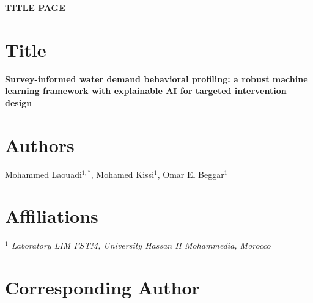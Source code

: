 \documentclass[a4paper,12pt]{article}
\begin{document}
\begin{center}
    \Large\textbf{TITLE PAGE}
\end{center}

\vspace{1cm}

\section*{Title}

\begin{center}
    \large\textbf{Survey-informed water demand behavioral profiling: a robust machine learning framework with explainable AI for targeted intervention design}
\end{center}

\vspace{0.5cm}

\section*{Authors}

\begin{center}
    Mohammed Laouadi$^{1,*}$, Mohamed Kissi$^{1}$, Omar El Beggar$^{1}$
\end{center}

\section*{Affiliations}

\begin{center}
    \textit{$^{1}$ Laboratory LIM FSTM, University Hassan II Mohammedia, Morocco}
\end{center}

\vspace{1cm}

\section*{Corresponding Author}
\end{document}
